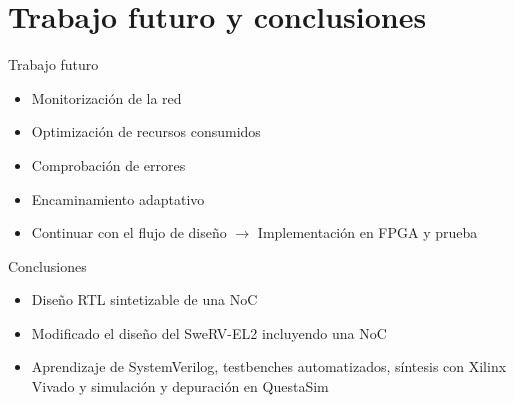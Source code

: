 \section{Trabajo futuro y conclusiones}

\begin{frame}{Trabajo futuro}
    \begin{itemize}
        \item Monitorización de la red
        \item Optimización de recursos consumidos
        \item Comprobación de errores
        \item Encaminamiento adaptativo
        \item Continuar con el flujo de diseño $\rightarrow$ Implementación en FPGA y prueba
    \end{itemize}
\end{frame}

\begin{frame}{Conclusiones}
    \begin{itemize}
        \item Diseño RTL sintetizable de una NoC
        \item Modificado el diseño del SweRV-EL2 incluyendo una NoC
        \item Aprendizaje de SystemVerilog, testbenches automatizados, síntesis con Xilinx Vivado y simulación y depuración en QuestaSim
    \end{itemize}
\end{frame}